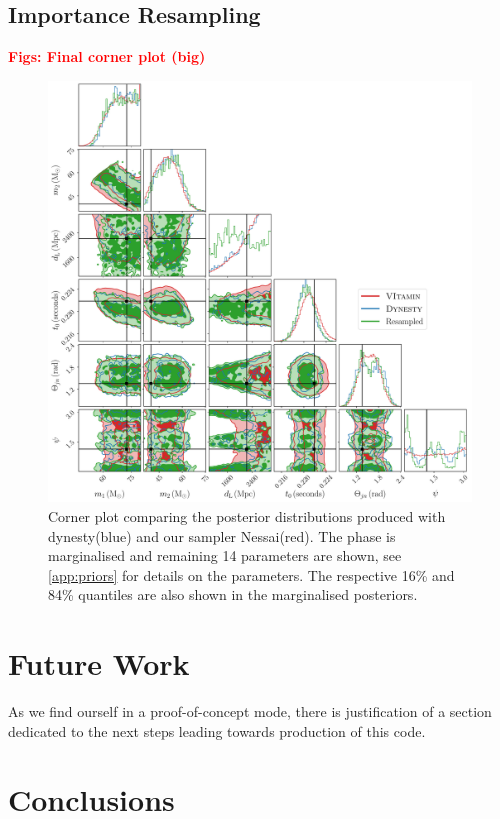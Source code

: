 \documentclass[aps,superscriptaddress,twocolumn,nopreprintnumbers,floatfix,groupedaddress]{revtex4-1}
\newcommand{\nessai}{{\sc Nessai}\xspace}
\newcommand{\dynesty}{{\sc dynesty}\xspace}
\newcommand{\doublefigwidth}{17.2cm}
\begin{document}
\subsection{Importance Resampling}


\textbf{\textcolor{red}{Figs: Final corner plot (big)}}

\begin{figure}[h]
	\centering
	\includegraphics[width=\doublefigwidth]{figs/resample_corner.pdf}
	\caption{Corner plot comparing the posterior distributions produced with \dynesty (blue) and our sampler \nessai (red). The phase is marginalised and remaining 14 parameters are shown, see \cref{app:priors} for details on the parameters. The respective 16\% and 84\% quantiles are also shown in the \protect{} marginalised posteriors.}
	\label{fig:corner}
\end{figure}

\section{Future Work}\label{future}

As we find ourself in a proof-of-concept mode, there is justification of a section dedicated to the next steps leading towards production of this code.

\section{Conclusions}\label{conc}
\end{document}
